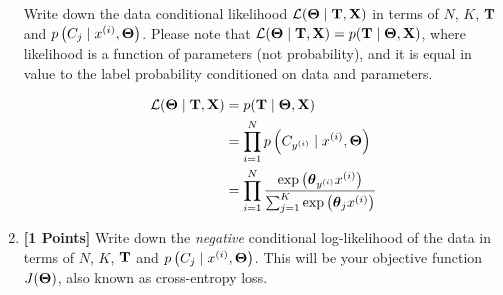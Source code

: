\begin{enumerate}[label=(\alph*)]
    Write down the data conditional likelihood $ \mathcal{L}(\boldsymbol \Theta \mid \mathbf{T}, \mathbf{X})$ in terms of $N$, $K$, $\mathbf{T}$ and $p\left(C_j \mid x^{(i)}, \boldsymbol \Theta \right)$. Please note that $\mathcal{L}(\boldsymbol \Theta \mid \mathbf{T}, \mathbf{X}) = p(\mathbf{T} \mid \boldsymbol \Theta, \mathbf{X})$, where likelihood is a function of parameters (not probability), and it is equal in value to the label probability conditioned on data and parameters.
    
    \begin{solution}
    \begin{equation}\nonumber
    \begin{aligned}
    \mathcal{L}(\boldsymbol \Theta \mid \mathbf{T}, \mathbf{X})
    &= p(\mathbf{T} \mid \boldsymbol \Theta, \mathbf{X})\\
    &= \prod_{i = 1}^Np\left(C_{y^{(i)}} \mid x^{(i)}, \boldsymbol \Theta \right)\\
    &= \prod_{i = 1}^N\frac{\exp\left(\boldsymbol \theta_{y^{(i)}} x^{(i)} \right)}{\sum_{j = 1}^K \exp\left(\boldsymbol \theta_{j} x^{(i)}\right)}
    \end{aligned}
    \end{equation}
    \bigskip \bigskip \bigskip \bigskip \bigskip \bigskip \bigskip \bigskip
    \bigskip \bigskip \bigskip \bigskip \bigskip \bigskip \bigskip \bigskip
    \bigskip \bigskip \bigskip \bigskip \bigskip \bigskip \bigskip \bigskip
    \bigskip \bigskip \bigskip \bigskip \bigskip \bigskip \bigskip \bigskip
    \end{solution}
    \clearpage
    
    
    
    
    
    \item {\bf [1 Points]} Write down the \emph{negative} conditional log-likelihood of the data in terms of $N$, $K$, $\mathbf{T}$ and $p\left(C_j \mid x^{(i)}, \boldsymbol \Theta \right)$. This will be your objective function $J(\boldsymbol \Theta)$, also known as cross-entropy loss.
    

\end{enumerate}
